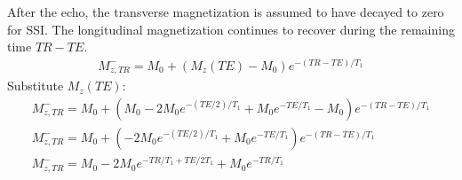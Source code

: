 \documentclass[10pt,a4paper,twoside]{article}
\begin{document}
\vspace{12pt}

After the echo, the transverse magnetization is assumed to have decayed to zero for SSI. The longitudinal magnetization continues to recover during the remaining time $TR-TE$.
\begin{gather*}
M_{z,TR}^- = M_0 + (M_z(TE) - M_0)e^{-(TR-TE)/T_1}
\end{gather*}
Substitute $M_z(TE)$:
\begin{gather*}
M_{z,TR}^- = M_0 + (M_0 - 2M_0 e^{-(TE/2)/T_1} + M_0 e^{-TE/T_1} - M_0)e^{-(TR-TE)/T_1} \\
M_{z,TR}^- = M_0 + (-2M_0 e^{-(TE/2)/T_1} + M_0 e^{-TE/T_1})e^{-(TR-TE)/T_1} \\
M_{z,TR}^- = M_0 - 2M_0 e^{-TR/T_1 + TE/2T_1} + M_0 e^{-TR/T_1}
\end{gather*}

\vspace{12pt}
\end{document}
